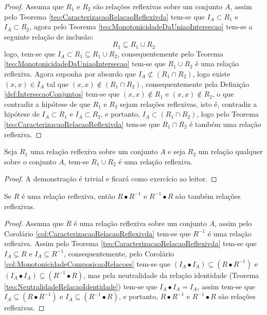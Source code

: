 \begin{proof}
	Assuma que $R_1$ e $R_2$ são relações reflexivas sobre um conjunto $A$, assim pelo Teorema \ref{teo:CaracterizacaoRelacaoReflexivda} tem-se que $I_A \subset R_1$ e $I_A \subset R_2$, agora pelo Teorema \ref{teo:MonotonicidadeDaUniaoIntersecao} tem-se a seguinte relação de inclusão:
	$$R_1 \subseteq R_1 \cup R_2$$
	logo, tem-se que $I_A \subset R_1 \subseteq R_1 \cup R_2$, consequentemente pelo Teorema \ref{teo:MonotonicidadeDaUniaoIntersecao} tem-se que $R_1 \cup R_2$ é uma relação reflexiva. Agora suponha por absurdo que $I_A \not\subset (R_1 \cap R_2)$, logo existe $(x, x) \in I_A$ tal que $(x, x) \notin (R_1 \cap R_2)$, consequentemente pela Definição \ref{def:IntersecaoConjuntos} tem-se que $(x, x) \notin R_1$ e $(x, x) \notin R_2$, o que contradiz a hipótese de que $R_1$ e $R_2$ sejam relações reflexivas, isto é, contradiz a hipótese de $I_A \subset R_1$ e $I_A \subset R_2$, e portanto, $I_A \subset (R_1 \cap R_2)$, logo pelo Teorema \ref{teo:CaracterizacaoRelacaoReflexivda} tem-se que $R_1 \cap R_2$ é também uma relação reflexiva.
\end{proof}

\begin{theorem}
	Seja $R_1$ uma relação reflexiva sobre um conjunto $A$ e seja $R_2$ um relação qualquer sobre o conjunto $A$, tem-se $R_1 \cup R_2$ é uma relação reflexiva.
\end{theorem}

\begin{proof}
	A demonstração é trivial e ficará como exercício ao leitor.
\end{proof}

\begin{theorem}
	Se $R$ é uma relação reflexiva, então $R \bullet R^{-1}$ e $R^{-1} \bullet R$ são também relações reflexivas.
\end{theorem}

\begin{proof}
	Assuma que $R$ é uma relação reflexiva sobre um conjunto $A$, assim pelo Corolário \ref{col:CaracterizacaoRelacaoReflexivda} tem-se que $R^{-1}$ é uma relação reflexiva. Assim pelo Teorema \ref{teo:CaracterizacaoRelacaoReflexivda} tem-se que $I_A \subseteq R$ e $I_A \subseteq R^{-1}$, consequentemente, pelo Corolário \ref{col:MonotonicidadeComposicaoRelacoes} tem-se que $(I_A \bullet I_A) \subseteq (R \bullet R^{-1})$ e $(I_A \bullet I_A) \subseteq (R^{-1} \bullet R)$, mas pela neutralidade da relação identidade (Teorema \ref{teo:NeutralidadeRelacaoIdentidade}) tem-se que $I_A \bullet I_A = I_A$, assim tem-se que  $I_A \subseteq (R \bullet R^{-1})$ e $I_A \subseteq (R^{-1} \bullet R)$, e portanto, $R \bullet R^{-1}$ e $R^{-1} \bullet R$ são relações reflexivas.
\end{proof}


